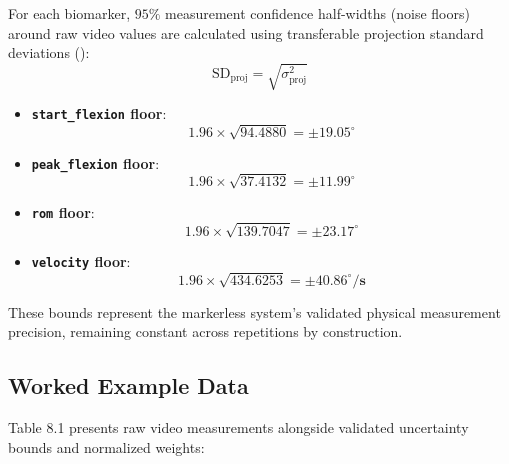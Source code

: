 For each biomarker, $95\%$ measurement confidence half-widths (noise floors) around raw video values are calculated using transferable projection standard deviations ():
\begin{equation}
  \text{SD}_{\text{proj}} = \sqrt{\sigma^2_{\text{proj}}}
  \label{eq:auto3}
\end{equation}
\begin{itemize}
  \item \textbf{\texttt{start\_flexion} floor}:
\begin{equation}
  1.96 \times \sqrt{94.4880} = \mathbf{\pm 19.05^\circ}
  \label{eq:auto4}
\end{equation}
  \item \textbf{\texttt{peak\_flexion} floor}:
\begin{equation}
  1.96 \times \sqrt{37.4132} = \mathbf{\pm 11.99^\circ}
  \label{eq:auto5}
\end{equation}
  \item \textbf{\texttt{rom} floor}:
\begin{equation}
  1.96 \times \sqrt{139.7047} = \mathbf{\pm 23.17^\circ}
  \label{eq:auto6}
\end{equation}
  \item \textbf{\texttt{velocity} floor}:
\begin{equation}
  1.96 \times \sqrt{434.6253} = \mathbf{\pm 40.86^\circ/\text{s}}
  \label{eq:auto7}
\end{equation}
\end{itemize}

These bounds represent the markerless system's validated physical measurement precision, remaining constant across repetitions by construction.

\subsection{Worked Example Data}
\label{sec:8-5-2-worked-example-data}

Table 8.1 presents raw video measurements alongside validated uncertainty bounds and normalized weights:


